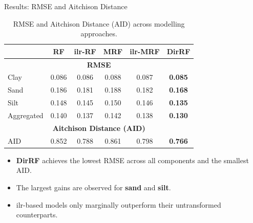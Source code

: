 \begin{frame}{Results: RMSE and Aitchison Distance}

\begin{table}
\centering\small
\caption{RMSE and Aitchison Distance (AID) across modelling approaches.}
\begin{tabular}{lccccc}
  \toprule
   & RF & ilr-RF & MRF & ilr-MRF & \textbf{DirRF} \\
  \midrule
  \multicolumn{6}{c}{\textbf{RMSE}} \\
  \midrule
  Clay       & 0.086 & 0.086 & 0.088 & 0.087 & \textbf{0.085} \\
  Sand       & 0.186 & 0.181 & 0.188 & 0.182 & \textbf{0.168} \\
  Silt       & 0.148 & 0.145 & 0.150 & 0.146 & \textbf{0.135} \\
  Aggregated & 0.140 & 0.137 & 0.142 & 0.138 & \textbf{0.130} \\
  \midrule
  \multicolumn{6}{c}{\textbf{Aitchison Distance (AID)}} \\
  \midrule
  AID & 0.852 & 0.788 & 0.861 & 0.798 & \textbf{0.766} \\
  \bottomrule
\end{tabular}
\end{table}

\begin{itemize}
  \item \textbf{DirRF} achieves the lowest RMSE across all components and the smallest AID.
  \item The largest gains are observed for \textbf{sand} and \textbf{silt}.
  \item ilr-based models only marginally outperform their untransformed counterparts.
\end{itemize}

\end{frame}